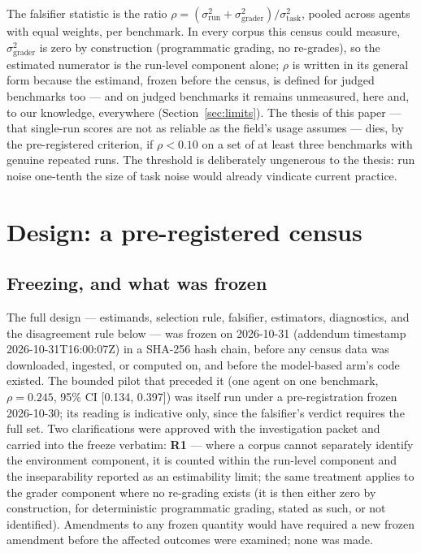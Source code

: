 \documentclass[11pt]{article}
\newcommand{\sT}{\sigma^2_{\mathrm{task}}}
\newcommand{\sR}{\sigma^2_{\mathrm{run}}}
\newcommand{\sG}{\sigma^2_{\mathrm{grader}}}
\begin{document}
The falsifier statistic is the ratio $\rho = (\sR + \sG)/\sT$, pooled
across agents with equal weights, per benchmark. In every corpus this
census could measure, $\sG$ is zero by construction (programmatic
grading, no re-grades), so the estimated numerator is the run-level
component alone; $\rho$ is written in its general form because the
estimand, frozen before the census, is defined for judged benchmarks
too --- and on judged benchmarks it remains unmeasured, here and, to
our knowledge, everywhere (Section~\ref{sec:limits}). The thesis of
this paper --- that single-run scores are not as reliable as the
field's usage assumes --- dies, by the pre-registered criterion, if
$\rho < 0.10$ on a set of at least three benchmarks with genuine
repeated runs. The threshold is deliberately ungenerous to the thesis:
run noise one-tenth the size of task noise would already vindicate
current practice.

\section{Design: a pre-registered census}
\label{sec:design}

\subsection{Freezing, and what was frozen}

The full design --- estimands, selection rule, falsifier, estimators,
diagnostics, and the disagreement rule below --- was frozen on
2026-10-31 (addendum timestamp 2026-10-31T16:00:07Z) in a SHA-256 hash
chain, before any census data was downloaded, ingested, or computed
on, and before the model-based arm's code existed. The bounded pilot
that preceded it (one agent on one benchmark, $\rho = 0.245$, 95\% CI
[0.134, 0.397]) was itself run under a pre-registration frozen
2026-10-30; its reading is indicative only, since the falsifier's
verdict requires the full set. Two clarifications were approved with
the investigation packet and carried into the freeze verbatim:
\textbf{R1} --- where a corpus cannot separately identify the
environment component, it is counted within the run-level component
and the inseparability reported as an estimability limit; the same
treatment applies to the grader component where no re-grading exists
(it is then either zero by construction, for deterministic
programmatic grading, stated as such, or not identified). Amendments
to any frozen quantity would have required a new frozen amendment
before the affected outcomes were examined; none was made.
\end{document}
